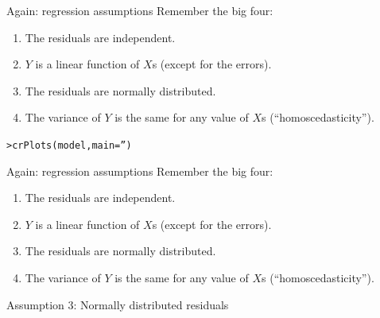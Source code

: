 \documentclass{beamer}\usepackage[]{graphicx}\usepackage[]{color}
\makeatletter
\newcommand{\hlstr}[1]{\textcolor[rgb]{1,0.894,0.71}{#1}}%
\newcommand{\hlstd}[1]{\textcolor[rgb]{1,0.894,0.769}{#1}}%
\newcommand{\hlkwc}[1]{\textcolor[rgb]{0.78,0.941,0.545}{#1}}%
\newcommand{\hlkwd}[1]{\textcolor[rgb]{1,0.78,0.769}{#1}}%
\newenvironment{kframe}{%
 \def\at@end@of@kframe{}%
 \ifinner\ifhmode%
  \def\at@end@of@kframe{\end{minipage}}%
  \begin{minipage}{\columnwidth}%
 \fi\fi%
 \def\FrameCommand##1{\hskip\@totalleftmargin \hskip-\fboxsep
 \colorbox{shadecolor}{##1}\hskip-\fboxsep
     \hskip-\linewidth \hskip-\@totalleftmargin \hskip\columnwidth}%
 \MakeFramed {\advance\hsize-\width
   \@totalleftmargin\z@ \linewidth\hsize
   \@setminipage}}%
 {\par\unskip\endMakeFramed%
 \at@end@of@kframe}
\newenvironment{knitrout}{}{} %
\makeatother
\begin{document}
\begin{darkframes}
    
    \begin{frame}{Again: regression assumptions}
      Remember the big four:
      \begin{enumerate}
        \item The residuals are independent.
        \item \alert{$Y$ is a linear function of $X$s (except for the errors).}
        \item The residuals are normally distributed.
        \item The variance of $Y$ is the same for any value of $X$s (``homoscedasticity'').
      \end{enumerate}
    \end{frame}
    
    
    
    \begin{frame}[fragile]%
    
\begin{knitrout}
\begin{kframe}
\begin{alltt}
\hlstd{> }\hlkwd{crPlots}\hlstd{(model,} \hlkwc{main}\hlstd{=}\hlstr{''}\hlstd{)}
\end{alltt}
\end{kframe}


\end{knitrout}
    \end{frame}   
    
    
    \begin{frame}{Again: regression assumptions}
      Remember the big four:
      \begin{enumerate}
        \item The residuals are independent.
        \item $Y$ is a linear function of $X$s (except for the errors).
        \item \alert{The residuals are normally distributed.}
        \item The variance of $Y$ is the same for any value of $X$s (``homoscedasticity'').
      \end{enumerate}
    \end{frame}
    
    
    
    \begin{frame}[fragile]{Assumption 3: Normally distributed residuals}
    

\end{frame}
\end{darkframes}
\end{document}
